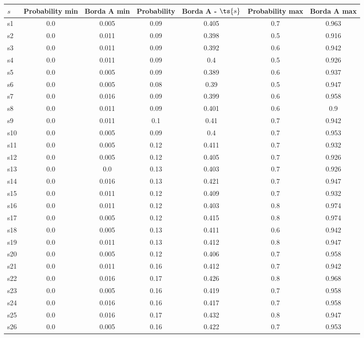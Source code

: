 \documentclass{article}
\begin{document}
\noindent\begin{tabular}{|l|c|c|c|c|c|c|}
\hline
$s$& Probability min & Borda A min & Probability & Borda A - $\ts{s}$ & Probability max & Borda A max\\
\hline
s1 &0.0 & 0.005 & 0.09 & 0.405 & 0.7 & 0.963\\
\hline
s2 &0.0 & 0.011 & 0.09 & 0.398 & 0.5 & 0.916\\
\hline
s3 &0.0 & 0.011 & 0.09 & 0.392 & 0.6 & 0.942\\
\hline
s4 &0.0 & 0.011 & 0.09 & 0.4 & 0.5 & 0.926\\
\hline
s5 &0.0 & 0.005 & 0.09 & 0.389 & 0.6 & 0.937\\
\hline
s6 &0.0 & 0.005 & 0.08 & 0.39 & 0.5 & 0.947\\
\hline
s7 &0.0 & 0.016 & 0.09 & 0.399 & 0.6 & 0.958\\
\hline
s8 &0.0 & 0.011 & 0.09 & 0.401 & 0.6 & 0.9\\
\hline
s9 &0.0 & 0.011 & 0.1 & 0.41 & 0.7 & 0.942\\
\hline
s10 &0.0 & 0.005 & 0.09 & 0.4 & 0.7 & 0.953\\
\hline
s11 &0.0 & 0.005 & 0.12 & 0.411 & 0.7 & 0.932\\
\hline
s12 &0.0 & 0.005 & 0.12 & 0.405 & 0.7 & 0.926\\
\hline
s13 &0.0 & 0.0 & 0.13 & 0.403 & 0.7 & 0.926\\
\hline
s14 &0.0 & 0.016 & 0.13 & 0.421 & 0.7 & 0.947\\
\hline
s15 &0.0 & 0.011 & 0.12 & 0.409 & 0.7 & 0.932\\
\hline
s16 &0.0 & 0.011 & 0.12 & 0.403 & 0.8 & 0.974\\
\hline
s17 &0.0 & 0.005 & 0.12 & 0.415 & 0.8 & 0.974\\
\hline
s18 &0.0 & 0.005 & 0.13 & 0.411 & 0.6 & 0.942\\
\hline
s19 &0.0 & 0.011 & 0.13 & 0.412 & 0.8 & 0.947\\
\hline
s20 &0.0 & 0.005 & 0.12 & 0.406 & 0.7 & 0.958\\
\hline
s21 &0.0 & 0.011 & 0.16 & 0.412 & 0.7 & 0.942\\
\hline
s22 &0.0 & 0.016 & 0.17 & 0.426 & 0.8 & 0.968\\
\hline
s23 &0.0 & 0.005 & 0.16 & 0.419 & 0.7 & 0.958\\
\hline
s24 &0.0 & 0.016 & 0.16 & 0.417 & 0.7 & 0.958\\
\hline
s25 &0.0 & 0.016 & 0.17 & 0.432 & 0.8 & 0.947\\
\hline
s26 &0.0 & 0.005 & 0.16 & 0.422 & 0.7 & 0.953\\

\end{tabular}
\end{document}
